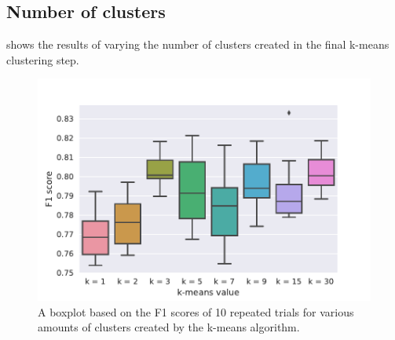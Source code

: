 \subsection{Number of clusters}
 shows the results of varying the number of clusters
created in the final k-means clustering step.
\begin{figure}[tb]
  \centering
    \centering
    \includegraphics[width=\textwidth]{./figures/results/kmeans/boxplot_f1.pdf}
    \caption{A boxplot based on the F1 scores of 10 repeated trials for various
    amounts of clusters created by the k-means algorithm.}%
    \label{fig:kmeans_box}
\end{figure}

\FloatBarrier%

